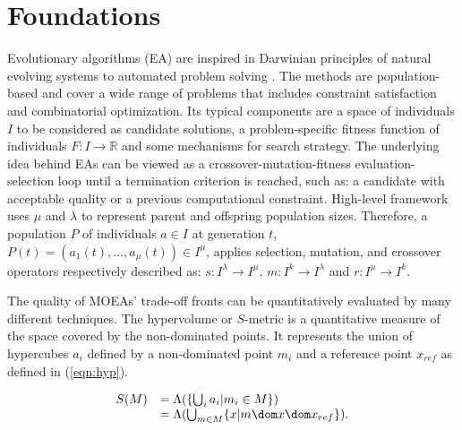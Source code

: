 \documentclass{llncs}
\begin{document}


\section{Foundations}

\marginpar{\textcolor{blue}{Evolutionary Alg.}}
Evolutionary algorithms (EA) are inspired in Darwinian principles of natural evolving systems to automated problem solving \cite{back-1996:evolutionary-algorithms}. The methods are population-based and cover a wide range of problems that includes constraint satisfaction and combinatorial optimization. Its typical components are a space of individuals $I$ to be considered as candidate solutions, a problem-specific fitness function of individuals $F: I \rightarrow \mathbb{R}$ and some mechanisms  for search strategy. The underlying idea behind EAs can be viewed as a crossover-mutation-fitness evaluation-selection loop until a termination criterion is reached, such as: a candidate with acceptable quality or a previous computational constraint. High-level  framework uses $\mu$ and $\lambda$ to represent  parent and offspring population sizes. Therefore, a population $P$ of individuals $a \in I$ at generation $t$, $P(t)=\left(a_1(t),\ldots, a_\mu(t)\right) \in I^\mu$, applies selection, mutation, and crossover operators respectively described as: $s: I^\lambda \rightarrow I^\mu$, $m: I^k \rightarrow I^\lambda$ and $r: I^\mu \rightarrow I^k$.  





\marginpar{\textcolor{blue}{Hypervolume}}
The quality of MOEAs' trade-off fronts can be quantitatively evaluated by many different techniques. The hypervolume or $S$-metric \cite{emmerich2005emo, zitzler1999multiobjective} is a quantitative measure of the space covered by the non-dominated points.   It represents the union of hypercubes $a_i$ defined by a non-dominated point $m_i$ and a reference point $x_{ref}$ as defined in (\ref{eqn:hyp}).  

\begin{equation}\label{eqn:hyp}
\begin{array}{rl}
 S(M) & = \Lambda(\{\bigcup_{i} a_i|m_i \in M\}) \\
      & = \Lambda( \bigcup_{m \in M} \{x|m \dom x \dom x_{ref}\}).\\
\end{array}
\end{equation}
\end{document}
